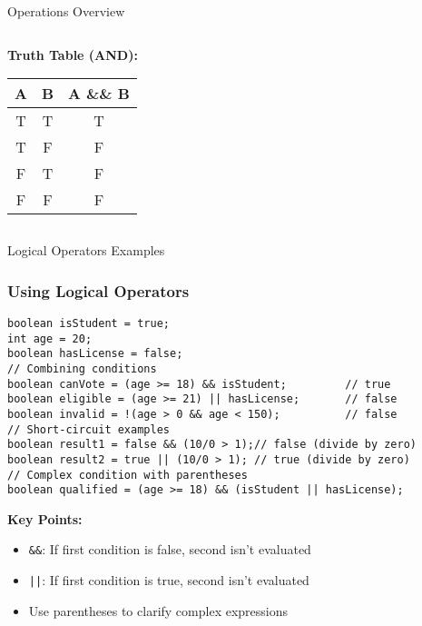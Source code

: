 \documentclass[aspectratio=169]{beamer}
\begin{document}
\begin{frame}{Operations Overview}
\begin{columns}[t]
\begin{column}{0.5\textwidth}
            \vspace{0.3em}
            
            \textbf{Truth Table (AND):}
            \begin{table}[h]
                \tiny
                \begin{tabular}{|c|c|c|}
                    \hline
                    A & B & A \&\& B \\
                    \hline
                    T & T & T \\
                    T & F & F \\
                    F & T & F \\
                    F & F & F \\
                    \hline
                \end{tabular}
            \end{table}
        \end{column}
    \end{columns}
    
    \vspace{0.3em}
    
\end{frame}

\begin{frame}[fragile]{Logical Operators Examples}
    \frametitle{Using Logical Operators}
    \begin{lstlisting}
boolean isStudent = true;
int age = 20;
boolean hasLicense = false;
// Combining conditions
boolean canVote = (age >= 18) && isStudent;         // true
boolean eligible = (age >= 21) || hasLicense;       // false
boolean invalid = !(age > 0 && age < 150);          // false
// Short-circuit examples
boolean result1 = false && (10/0 > 1);// false (divide by zero)
boolean result2 = true || (10/0 > 1); // true (divide by zero)
// Complex condition with parentheses
boolean qualified = (age >= 18) && (isStudent || hasLicense);
    \end{lstlisting}
    \vspace{-0.2em}
    \scriptsize \textbf{Key Points:}
    \begin{itemize}
        \item \texttt{\&\&}: If first condition is false, second isn't evaluated
        \item \texttt{||}: If first condition is true, second isn't evaluated
        \item Use parentheses to clarify complex expressions
    \end{itemize}
\end{frame}
\end{document}
